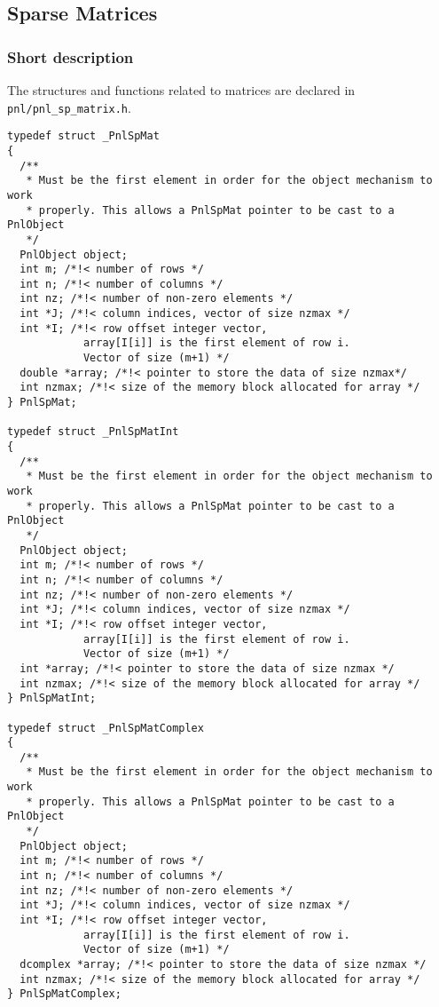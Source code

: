 \subsection{Sparse Matrices}
\subsubsection{Short description}
The structures and functions related to matrices are declared in
\verb!pnl/pnl_sp_matrix.h!.

\begin{verbatim}
typedef struct _PnlSpMat
{
  /** 
   * Must be the first element in order for the object mechanism to work
   * properly. This allows a PnlSpMat pointer to be cast to a PnlObject
   */
  PnlObject object; 
  int m; /*!< number of rows */
  int n; /*!< number of columns */
  int nz; /*!< number of non-zero elements */
  int *J; /*!< column indices, vector of size nzmax */
  int *I; /*!< row offset integer vector, 
            array[I[i]] is the first element of row i.
            Vector of size (m+1) */ 
  double *array; /*!< pointer to store the data of size nzmax*/
  int nzmax; /*!< size of the memory block allocated for array */
} PnlSpMat;

typedef struct _PnlSpMatInt
{
  /** 
   * Must be the first element in order for the object mechanism to work
   * properly. This allows a PnlSpMat pointer to be cast to a PnlObject
   */
  PnlObject object; 
  int m; /*!< number of rows */
  int n; /*!< number of columns */
  int nz; /*!< number of non-zero elements */
  int *J; /*!< column indices, vector of size nzmax */
  int *I; /*!< row offset integer vector, 
            array[I[i]] is the first element of row i.
            Vector of size (m+1) */ 
  int *array; /*!< pointer to store the data of size nzmax */
  int nzmax; /*!< size of the memory block allocated for array */
} PnlSpMatInt;

typedef struct _PnlSpMatComplex
{
  /** 
   * Must be the first element in order for the object mechanism to work
   * properly. This allows a PnlSpMat pointer to be cast to a PnlObject
   */
  PnlObject object; 
  int m; /*!< number of rows */
  int n; /*!< number of columns */
  int nz; /*!< number of non-zero elements */
  int *J; /*!< column indices, vector of size nzmax */
  int *I; /*!< row offset integer vector, 
            array[I[i]] is the first element of row i.
            Vector of size (m+1) */ 
  dcomplex *array; /*!< pointer to store the data of size nzmax */
  int nzmax; /*!< size of the memory block allocated for array */
} PnlSpMatComplex;
\end{verbatim}

